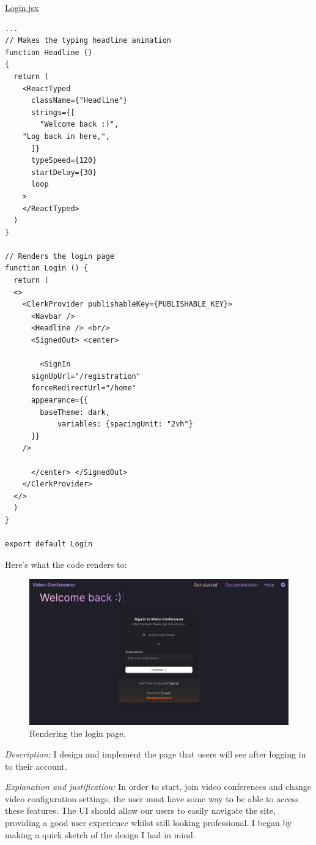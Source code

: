 \underline{Login.jsx}	

\begin{verbatim}
...
// Makes the typing headline animation
function Headline () 
{
  return (
    <ReactTyped 
      className={"Headline"}
      strings={[
        "Welcome back :)",
	"Log back in here,",
      ]}
      typeSpeed={120}
      startDelay={30}
      loop
    >
    </ReactTyped>
  )
}

// Renders the login page
function Login () {
  return (
  <> 
    <ClerkProvider publishableKey={PUBLISHABLE_KEY}>
      <Navbar />
      <Headline /> <br/> 
      <SignedOut> <center>

        <SignIn 
	  signUpUrl="/registration"
	  forceRedirectUrl="/home"
	  appearance={{
	    baseTheme: dark,
            variables: {spacingUnit: "2vh"}
	  }}
	/>

      </center> </SignedOut>
    </ClerkProvider> 
  </>
  )
}

export default Login
\end{verbatim}

Here's what the code renders to: \\

\begin{figure}[H]

\centering
\includegraphics[scale=0.2]{Images/Login.png}

\caption{Rendering the login page.}

\end{figure}

\textit{Description:} I design and implement the page that 
users will see after logging in to their account. \\
\vspace{0.2cm}

\textit{Explanation and justification:} In order to start, 
join video conferences and change video configuration
settings, the user must have some way to be able to access 
these features. The UI should allow our users to easily 
navigate the site, providing a good user experience whilst 
still looking professional. I began by making a quick sketch
of the design I had in mind. \\

